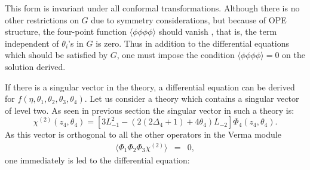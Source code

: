\documentclass[a4paper,11pt]{article}
\begin{document}
$\:\:\:\:\:\:\:\:\:\:\:\:\:\:\:\:\:\:$

This form is invariant under all conformal transformations.
Although there is no other restrictions on $G$ due to symmetry
considerations, but because of OPE structure, the four-point
function $\langle\phi\phi\phi\phi\rangle$ should vanish
\cite{MRS,FlohrNew}, that is, the term independent of $\theta_i$'s
in $G$ is zero. Thus in addition to the differential equations
which should be satisfied by $G$, one must impose the condition
$\langle\phi\phi\phi\phi\rangle=0$ on the solution derived.

If there is a singular vector in the theory, a differential
equation can be derived for
$f(\eta,\theta_{1},\theta_{2},\theta_{3},\theta_{4})$. Let us
consider a theory which contains a singular vector of level two.
As seen in previous section the singular vector in such a theory
is:
\begin{equation}
\chi^{(2)}(z_{4},\theta_{4})=\left[3
L_{-1}^{2}-(2(2\Delta_{4}+1)+4\theta_{4})L_{-2}\right]\Phi_{4}(z_{4},\theta_{4})
.
\end{equation}
As this vector is orthogonal to all the other operators in the
Verma module
\begin{eqnarray}
\langle\Phi_{1}\Phi_{2}\Phi_{3}\chi^{(2)}\rangle&=&0 ,
\end{eqnarray}
one immediately is led to the differential equation:
\end{document}
